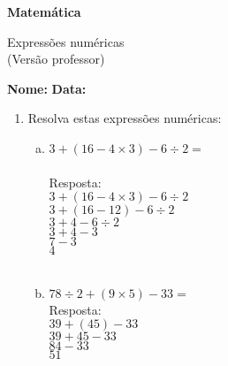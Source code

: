 \documentclass[a4paper,14pt]{article}
\begin{document}
	
	\noindent\textbf{Matemática} 
	
	\begin{center}Expressões numéricas \\ (Versão professor)
	\end{center}
	
	\noindent\textbf{Nome:} \underline{\hspace{10cm}}
	\noindent\textbf{Data:} \underline{\hspace{4cm}}
	
	
	
    \begin{multicols}{2}
		\begin{enumerate}
			\item Resolva estas expressões numéricas:
			\begin{enumerate}[a)]
				\item $3 + (16 - 4 \times 3) - 6 \div 2 = $  \\\\
				Resposta: \\
				
				$3 + (16 - 4 \times 3) - 6 \div 2$\\
				$3 + (16 - 12) - 6 \div 2$\\
				$3 + 4 - 6 \div 2$\\
				$3 + 4 - 3$\\
				$7 - 3$\\
				$4$ \\\\
				\item $78 \div 2 + (9 \times 5) - 33 = $ \\
				
				Resposta: \\
				
				$39 + (45) - 33$\\
				$39 + 45 - 33$\\
				$84 - 33$\\
				$51$\\\\\\\\\\\\\\\\\\\\\\\
				

\end{enumerate}
\end{enumerate}
\end{multicols}
\end{document}
